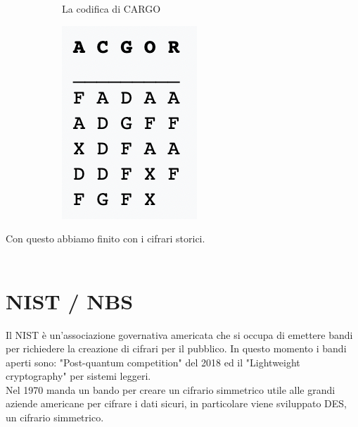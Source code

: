 \documentclass[11pt, oneside]{article}   	%
\begin{document}
\begin{figure}[H]
\begin{subfigure}[h]{0.5\linewidth}
\caption*{La codifica di CARGO}
\end{subfigure}
\hfill
\begin{subfigure}[h]{0.2\linewidth}
\includegraphics[width=\linewidth]{post}
\end{subfigure}%
\end{figure}
Con questo abbiamo finito con i cifrari storici.\\\\
\section*{NIST / NBS}
Il NIST è un'associazione governativa americata che si occupa di emettere bandi per richiedere la creazione di cifrari per il pubblico. In questo momento i bandi aperti sono: "Post-quantum competition" del 2018 ed il "Lightweight cryptography" per sistemi leggeri.\\
Nel 1970 manda un bando per creare un cifrario simmetrico utile alle grandi aziende americane per cifrare i dati sicuri, in particolare viene sviluppato DES, un cifrario simmetrico.
\end{document}
